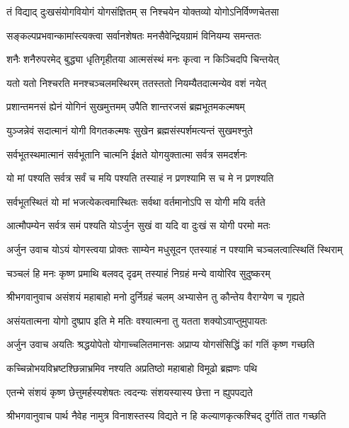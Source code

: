 \twolineshloka
{तं विद्याद् दुःखसंयोगवियोगं योगसंज्ञितम्}
{स निश्चयेन योक्तव्यो योगोऽनिर्विण्णचेतसा}%

\twolineshloka
{सङ्कल्पप्रभवान्कामांस्त्यक्त्वा सर्वानशेषतः}
{मनसैवेन्द्रियग्रामं विनियम्य समन्ततः}%

\twolineshloka
{शनैः शनैरुपरमेद् बुद्ध्या धृतिगृहीतया}
{आत्मसंस्थं मनः कृत्वा न किञ्चिदपि चिन्तयेत्}%

\twolineshloka
{यतो यतो निश्चरति मनश्चञ्चलमस्थिरम्}
{ततस्ततो नियम्यैतदात्मन्येव वशं नयेत्}%

\twolineshloka
{प्रशान्तमनसं ह्येनं योगिनं सुखमुत्तमम्}
{उपैति शान्तरजसं ब्रह्मभूतमकल्मषम्}%

\twolineshloka
{युञ्जन्नेवं सदात्मानं योगी विगतकल्मषः}
{सुखेन ब्रह्मसंस्पर्शमत्यन्तं सुखमश्नुते}%

\twolineshloka
{सर्वभूतस्थमात्मानं सर्वभूतानि चात्मनि}
{ईक्षते योगयुक्तात्मा सर्वत्र समदर्शनः}%

\twolineshloka
{यो मां पश्यति सर्वत्र सर्वं च मयि पश्यति}
{तस्याहं न प्रणश्यामि स च मे न प्रणश्यति}%

\twolineshloka
{सर्वभूतस्थितं यो मां भजत्येकत्वमास्थितः}
{सर्वथा वर्तमानोऽपि स योगी मयि वर्तते}%

\twolineshloka
{आत्मौपम्येन सर्वत्र समं पश्यति योऽर्जुन}
{सुखं वा यदि वा दुःखं स योगी परमो मतः}%

{अर्जुन उवाच}
\twolineshloka
{योऽयं योगस्त्वया प्रोक्तः साम्येन मधुसूदन}
{एतस्याहं न पश्यामि चञ्चलत्वात्स्थितिं स्थिराम्}%

\twolineshloka
{चञ्चलं हि मनः कृष्ण प्रमाथि बलवद् दृढम्}
{तस्याहं निग्रहं मन्ये वायोरिव सुदुष्करम्}%

{श्रीभगवानुवाच}
\twolineshloka
{असंशयं महाबाहो मनो दुर्निग्रहं चलम्}
{अभ्यासेन तु कौन्तेय वैराग्येण च गृह्यते}%

\twolineshloka
{असंयतात्मना योगो दुष्प्राप इति मे मतिः}
{वश्यात्मना तु यतता शक्योऽवाप्तुमुपायतः}%

{अर्जुन उवाच}
\twolineshloka
{अयतिः श्रद्धयोपेतो योगाच्चलितमानसः}
{अप्राप्य योगसंसिद्धिं कां गतिं कृष्ण गच्छति}%

\twolineshloka
{कच्चिन्नोभयविभ्रष्टश्छिन्नाभ्रमिव नश्यति}
{अप्रतिष्ठो महाबाहो विमूढो ब्रह्मणः पथि}%

\twolineshloka
{एतन्मे संशयं कृष्ण छेत्तुमर्हस्यशेषतः}
{त्वदन्यः संशयस्यास्य छेत्ता न ह्युपपद्यते}%

{श्रीभगवानुवाच}
\twolineshloka
{पार्थ नैवेह नामुत्र विनाशस्तस्य विद्यते}
{न हि कल्याणकृत्कश्चिद् दुर्गतिं तात गच्छति}%

